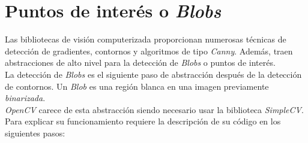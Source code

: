 \section{Puntos de interés o \emph{Blobs}}
Las bibliotecas de visión computerizada proporcionan numerosas
técnicas de detección de gradientes, contornos y algoritmos de tipo
\emph{Canny}. Además, traen abstracciones de alto nivel para la
detección de \emph{Blobs} o puntos de interés. \\
La detección de \emph{Blobs} es el siguiente paso de abstracción
después de la detección de contornos. Un \emph{Blob} es una región
blanca en una imagen previamente \emph{binarizada}. \\
\emph{OpenCV} carece de esta abstracción siendo necesario usar la
biblioteca \emph{SimpleCV}. Para explicar su funcionamiento requiere
la descripción de su código en los siguientes pasos:
